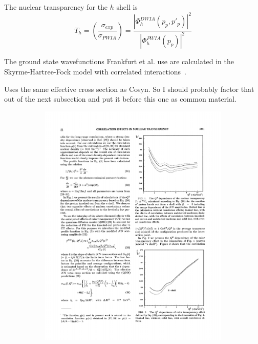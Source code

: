 The nuclear transparency for the $h$ shell is
\begin{equation}
    T_h = \left(\frac{\sigma_{exp}}{\sigma_{PWIA}}\right)
        = \frac{|\Phi^{DWIA}_h(p_p,p'_p)|^2}
               {|\Phi^{PWIA}_h(p_p)|^2}
\end{equation}

The ground state wavefunctions Frankfurt et al. use are calculated in the
Skyrme-Hartree-Fock model with correlated interactions~\cite{Reinhard_1991}.

Uses the same effective cross section as Cosyn. So I should probably factor
that out of the next subsection and put it before this one as common material.

\begin{figure}[h]
    \centering
    \begin{subfigure}[b]{0.45\textwidth}
        \centering
        \includegraphics[width=\textwidth]{chap1/frankfurt_transparency_without_CT.pdf}
        \label{fig:frankfurt_transparency_without_CT}

\end{subfigure}
\end{figure}
